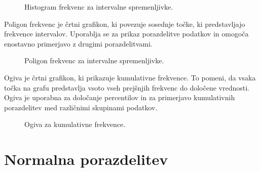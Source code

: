 \begin{figure}
    \centering
    \caption{Histogram frekvenc za intervalne spremenljivke.}
\end{figure}

Poligon frekvenc je črtni grafikon, ki povezuje sosednje točke, ki predstavljajo frekvence intervalov. Uporablja se za prikaz porazdelitve podatkov in omogoča enostavno primerjavo z drugimi porazdelitvami.

\begin{figure}
    \centering
    \caption{Poligon frekvenc za intervalne spremenljivke.}
\end{figure}

Ogiva je črtni grafikon, ki prikazuje kumulativne frekvence. To pomeni, da vsaka točka na grafu predstavlja vsoto vseh prejšnjih frekvenc do določene vrednosti. Ogiva je uporabna za določanje percentilov in za primerjavo kumulativnih porazdelitev med različnimi skupinami podatkov.

\begin{figure}
    \centering
    \caption{Ogiva za kumulativne frekvence.}
\end{figure}

\section{Normalna porazdelitev}


